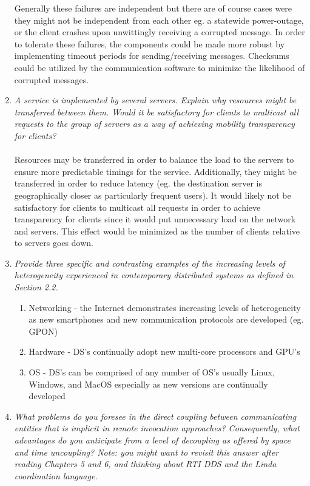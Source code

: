 \documentclass[11pt]{article}
\theoremstyle{plain}
\theoremstyle{definition}
\begin{document}
\begin{enumerate}
\begin{enumerate}[\hspace{0.5cm}(1)]
	\end{enumerate}
	Generally these failures are independent but there are of course cases were they might not be independent from each other eg. a statewide power-outage, or the client crashes upon unwittingly receiving a corrupted message. In order to tolerate these failures, the components could be made more robust by implementing timeout periods for sending/receiving messages. Checksums could be utilized by the communication software to minimize the likelihood of corrupted messages.
	\item \textit{A service is implemented by several servers. Explain why resources might be transferred between them. Would it be satisfactory for clients to multicast all requests to the group of servers as a way of achieving mobility transparency for clients?} \\
	\\
	Resources may be transferred in order to balance the load to the servers to ensure more predictable timings for the service. Additionally, they might be transferred in order to reduce latency (eg. the destination server is geographically closer as particularly frequent users). It would likely not be satisfactory for clients to multicast all requests in order to achieve transparency for clients since it would put unnecessary load on the network and servers. This effect would be minimized as the number of clients relative to servers goes down.
	\item \textit{Provide three specific and contrasting examples of the increasing levels of heterogeneity experienced in contemporary distributed systems as defined in Section 2.2.}
	\begin{enumerate}[\hspace{0.5cm}(1)]
		\item Networking - the Internet demonstrates increasing levels of heterogeneity as new smartphones and new communication protocols are developed (eg. GPON)
		\item Hardware - DS's continually adopt new multi-core processors and GPU's 
		\item OS - DS's can be comprised of any number of OS's usually Linux, Windows, and MacOS especially as new versions are continually developed
	\end{enumerate}
	\item \textit{What problems do you foresee in the direct coupling between communicating entities that is implicit in remote invocation approaches? Consequently, what advantages do you anticipate from a level of decoupling as offered by space and time uncoupling? Note: you might want to revisit this answer after reading Chapters 5 and 6, and thinking about RTI DDS and the Linda coordination language.} \\

\end{enumerate}
\end{document}
